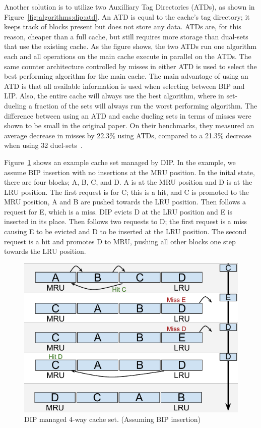 Another solution is to utilize two Auxilliary Tag Directories (ATDs), as shown in Figure~\ref{fig:algorithms:dip:atd}.
An ATD is equal to the cache's tag directory; it keeps track of blocks present but does not store any data.
ATDs are, for this reason, cheaper than a full cache, but still requires more storage than dual-sets that use the existing cache.
As the figure shows, the two ATDs run one algorithm each and all operations on the main cache execute in parallel on the ATDs.
The same counter architecture controlled by misses in either ATD is used to select the best performing algorithm for the main cache.
The main advantage of using an ATD is that all available information is used when selecting between BIP and LIP.
Also, the entire cache will always use the best algorithm, where in set-dueling a fraction of the sets will always run the worst performing algorithm.
The difference between using an ATD and cache dueling sets in terms of misses were shown to be small in the original paper.
On their benchmarks, they measured an average decrease in misses by 22.3\% using ATDs, compared to a 21.3\% decrease when using 32 duel-sets~\cite{Qureshi2007}.

Figure~\ref{fig:algorithms:bip_example} shows an example cache set managed by DIP.
In the example, we assume BIP insertion with no insertions at the MRU position.
In the inital state, there are four blocks; A, B, C, and D.
A is at the MRU position and D is at the LRU position.
The first request is for C; this is a hit, and C is promoted to the MRU position, A and B are pushed towards the LRU position.
Then follows a request for E, which is a miss.
DIP evicts D at the LRU position and E is inserted in its place.
Then follows two requests to D; the first request is a miss causing E to be evicted and D to be inserted at the LRU position.
The second request is a hit and promotes D to MRU, pushing all other blocks one step towards the LRU position.

\begin{figure}[ht]
    \centering
    \includegraphics[width=.65\textwidth]{figures/algorithms/DIP}
    \caption[DIP managed 4-way cache set.]{DIP managed 4-way cache set. (Assuming BIP insertion)}
    \label{fig:algorithms:bip_example}
\end{figure}
